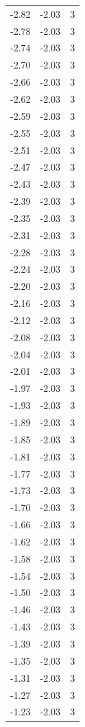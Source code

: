 \begin{longtable}{lrr}
  -2.82 & -2.03 & 3 \\
  -2.78 & -2.03 & 3 \\
  -2.74 & -2.03 & 3 \\
  -2.70 & -2.03 & 3 \\
  -2.66 & -2.03 & 3 \\
  -2.62 & -2.03 & 3 \\
  -2.59 & -2.03 & 3 \\
  -2.55 & -2.03 & 3 \\
  -2.51 & -2.03 & 3 \\
  -2.47 & -2.03 & 3 \\
  -2.43 & -2.03 & 3 \\
  -2.39 & -2.03 & 3 \\
  -2.35 & -2.03 & 3 \\
  -2.31 & -2.03 & 3 \\
  -2.28 & -2.03 & 3 \\
  -2.24 & -2.03 & 3 \\
  -2.20 & -2.03 & 3 \\
  -2.16 & -2.03 & 3 \\
  -2.12 & -2.03 & 3 \\
  -2.08 & -2.03 & 3 \\
  -2.04 & -2.03 & 3 \\
  -2.01 & -2.03 & 3 \\
  -1.97 & -2.03 & 3 \\
  -1.93 & -2.03 & 3 \\
  -1.89 & -2.03 & 3 \\
  -1.85 & -2.03 & 3 \\
  -1.81 & -2.03 & 3 \\
  -1.77 & -2.03 & 3 \\
  -1.73 & -2.03 & 3 \\
  -1.70 & -2.03 & 3 \\
  -1.66 & -2.03 & 3 \\
  -1.62 & -2.03 & 3 \\
  -1.58 & -2.03 & 3 \\
  -1.54 & -2.03 & 3 \\
  -1.50 & -2.03 & 3 \\
  -1.46 & -2.03 & 3 \\
  -1.43 & -2.03 & 3 \\
  -1.39 & -2.03 & 3 \\
  -1.35 & -2.03 & 3 \\
  -1.31 & -2.03 & 3 \\
  -1.27 & -2.03 & 3 \\
  -1.23 & -2.03 & 3 \\

\end{longtable}

